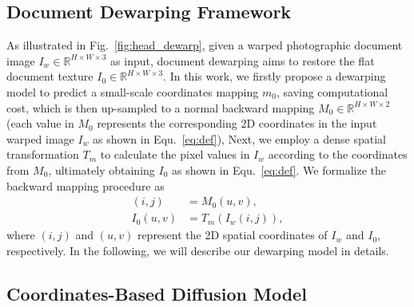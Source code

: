 \subsection{Document Dewarping Framework}
\label{sec:Framework}
As illustrated in Fig.~\ref{fig:head_dewarp}, given a warped photographic document image $I_w\in \mathbb{R}^{H\times W\times 3}$ as input, document dewarping aims to restore the flat document texture $I_0\in \mathbb{R}^{H\times W\times 3}$. In this work, we firstly propose a dewarping model to predict a small-scale coordinates mapping $m_0$, saving computational cost, which is then up-sampled to a normal backward mapping $M_0\in \mathbb{R}^{H\times W\times 2}$ (each value in $M_0$ represents the corresponding 2D coordinates in the input warped image $I_w$ as shown in Equ.~\ref{eq:def}), Next, we employ a dense spatial transformation $T_{m}$ to calculate the pixel values in $I_w$ according to the coordinates from $M_0$, ultimately obtaining $I_0$ as shown in Equ.~\ref{eq:def}. 
We formalize the backward mapping procedure as
\begin{equation}
\label{eq:def}
\begin{split}
(i,j)&=M_0(u,v),\\
I_0 (u,v)&= T_{m}(I_w(i,j)),
\end{split}
\end{equation}
where $(i,j)$ and $(u,v)$ represent the 2D spatial coordinates of $I_w$ and $I_0$, respectively. In the following, we will describe our dewarping model in details.




\subsection{Coordinates-Based Diffusion Model}
\label{sec:method31}
